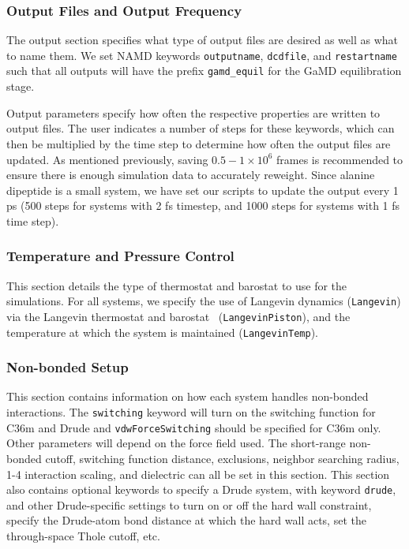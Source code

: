 \documentclass[9pt,tutorial,pubversion]{livecoms}
\begin{document}
\subsubsection{Output Files and Output Frequency}
The output section specifies what type of output files are desired as well as what to name them. We set NAMD keywords \texttt{outputname}, \texttt{dcdfile}, and \texttt{restartname} such that all outputs will have the prefix \texttt{gamd\_equil} for the GaMD equilibration stage. 

Output parameters specify how often the respective properties are written to output files. The user indicates a number of steps for these keywords, which can then be multiplied by the time step to determine how often the output files are updated. As mentioned previously, saving $0.5 - 1 \times 10^6$ frames is recommended to ensure there is enough simulation data to accurately reweight. Since alanine dipeptide is a small system, we have set our scripts to update the output every 1 ps (500 steps for systems with 2 fs timestep, and 1000 steps for systems with 1 fs time step). 

\subsubsection{Temperature and Pressure Control}
This section details the type of thermostat and barostat to use for the simulations. For all systems, we specify the use of Langevin dynamics (\texttt{Langevin}) via the Langevin thermostat and barostat~\cite{feller_langevinpiston_1995} (\texttt{LangevinPiston}), and the temperature at which the system is maintained (\texttt{LangevinTemp}).

\subsubsection{Non-bonded Setup}
This section contains information on how each system handles non-bonded interactions. The \texttt{switching} keyword will turn on the switching function for C36m and Drude and \texttt{vdwForceSwitching} should be specified for C36m only. Other parameters will depend on the force field used. The short-range non-bonded cutoff, switching function distance, exclusions, neighbor searching radius, 1-4 interaction scaling, and dielectric can all be set in this section. This section also contains optional keywords to specify a Drude system, with keyword \texttt{drude}, and other Drude-specific settings to turn on or off the hard wall constraint, specify the Drude-atom bond distance at which the hard wall acts, set the through-space Thole cutoff, etc. 
\end{document}
